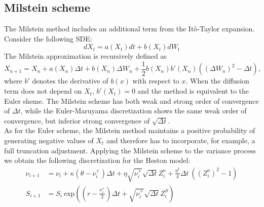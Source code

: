\documentclass[12pt]{article}
\numberwithin{equation}{section}
\begin{document}
\subsection{Milstein scheme}
The Milstein method includes an additional term from the It\^o-Taylor expansion. Consider the following SDE:
\begin{equation*}
dX_t = a(X_t)dt + b(X_t)dW_t
\end{equation*}
The Milstein approximation is recursively defined as
\begin{equation*}
X_{n+1} = X_n + a(X_n)\Delta t + b(X_n)\Delta W_n + \frac{1}{2}b(X_n)b'(X_n)( (\Delta W_n)^2 - \Delta t ),
\end{equation*}
where $b'$ denotes the derivative of $b(x)$ with respect to $x$. When the diffusion term does not depend on $X_t$, $b'(X_t)=0$ and the method is equivalent to the Euler sheme. The Milstein scheme has both weak and strong order of convergence of $\Delta t$, while the Euler-Maruyama discretization shows the same weak order of convergence, but inferior strong convergence of $\sqrt{\Delta t}$.\\
\newline	
As for the Euler scheme, the Milstein method maintains a positive probability of generating negative values of $X_t$ and therefore has to incorporate, for example, a full truncation adjustment. Applying the Milstein scheme to the variance process we obtain the following discretization for the Heston model:
\begin{equation}\label{Milstein}
	\begin{aligned}
		\nu_{i+1} &= \nu_{i} + \kappa(\theta - \nu_{i}^+)\Delta t + \eta\sqrt{\nu_{i}^+}\sqrt{\Delta t}Z_i^\nu + \frac{\eta^2}{4}\Delta t \ ( (Z_i^\nu)^2 - 1 ) \\
		S_{i+1} &= S_i \ \text{exp} \left ( \left (r - \frac{\nu_i^+}{2} \right  ) \Delta t + \sqrt{\nu_i^+} \sqrt{\Delta t} Z_i^S \right )
	\end{aligned}
\end{equation}
\end{document}
